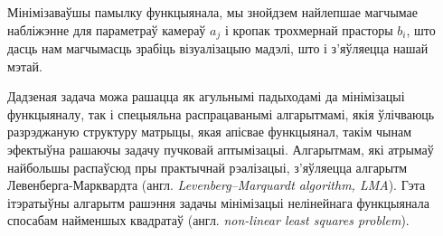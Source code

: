 \vspace{4mm}

Мінімізаваўшы памылку функцыянала, мы знойдзем найлепшае магчымае набліжэнне для
параметраў камераў $a_{j}$ і кропак трохмернай прасторы $b_{i}$,
што дасць нам магчымасць зрабіць візуалізацыю мадэлі, што і з'яўляецца нашай мэтай.

Дадзеная задача можа рашацца як агульнымі падыходамі да мінімізацыі функцыяналу,
так і спецыяльна распрацаванымі алгарытмамі, якія ўлічваюць разрэджаную структуру матрыцы,
якая апісвае функцыянал, такім чынам эфектыўна рашаючы задачу пучковай аптымізацыі.
Алгарытмам, які атрымаў найбольшы распаўсюд пры практычнай рэалізацыі,
з'яўляецца алгарытм Левенберга-Марквардта (англ. \textit{Levenberg–Marquardt algorithm, LMA}).
Гэта ітэратыўны алгарытм рашэння задачы мінімізацыі нелінейнага функцыянала спосабам
найменшых квадратаў (англ. \textit{non-linear least squares problem}).

\newpage
